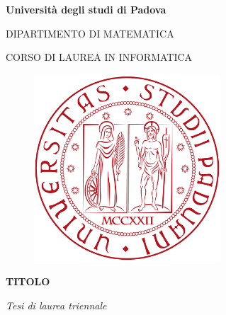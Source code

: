 \begin{titlepage}

\begin{center}

\begin{LARGE}
\textbf{Università degli studi di Padova}\\
\end{LARGE}

\vspace{10pt}

\begin{Large}
\textsc{DIPARTIMENTO DI MATEMATICA}\\
\end{Large}

\vspace{10pt}

\begin{large}
\textsc{CORSO DI LAUREA IN INFORMATICA}\\
\end{large}

\vspace{30pt}
\begin{figure}[htbp]
\begin{center}
\includegraphics[height=7cm]{Pics/logo-unipd.png}
\end{center}
\end{figure}
\vspace{30pt} 

\begin{LARGE}
\begin{center}
\textbf{TITOLO}\\
\end{center}
\end{LARGE}

\vspace{10pt} 

\begin{large}
\textsl{Tesi di laurea triennale}\\
\end{large}


\end{center}
\end{titlepage}
